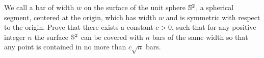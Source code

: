 We call a bar of width ${w}$ on the surface of the unit sphere ${\Bbb{S}^2}$, a spherical segment, centered at the origin, which has width ${w}$ and is symmetric with respect to the origin.
Prove that there exists a constant ${c>0}$, such that for any positive integer ${n}$ the surface ${\Bbb{S}^2}$ can be covered with ${n}$ bars of the same width so that any point is contained in no more than ${c\sqrt{n}}$ bars.